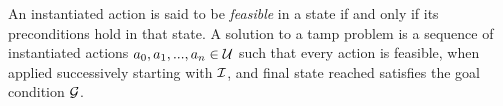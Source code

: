 An instantiated action is said to be \emph{feasible} in a state if and
only if its preconditions hold in that state. A solution to a {\sc
  tamp} problem is a sequence of instantiated actions $a_{0}, a_{1},
..., a_{n} \in \mathcal{U}$ such that every action is feasible, when applied
successively starting with $\mathcal{I}$, and final state reached satisfies the
goal condition $\mathcal{G}$.






